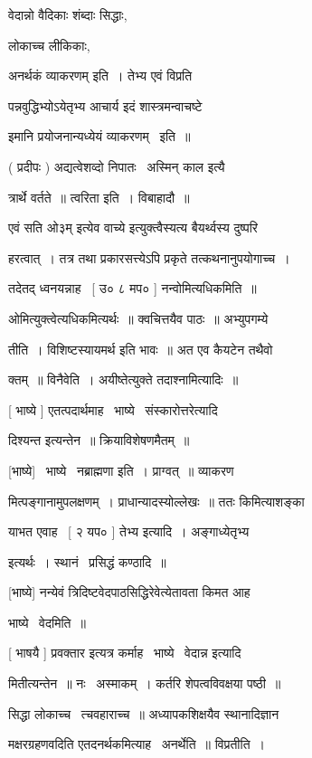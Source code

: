 \documentclass[11pt, openany]{book}
\begin{document}
{\qt वेदान्नो वैदिकाः शंब्दाः सिद्धाः}, 

लोकाच्च लीकिकाः, 

{\qt अनर्थकं व्याकरणम्} इति~। तेभ्य एवं विप्रति \textendash\ 

पन्नवुद्धिभ्योऽयेतृभ्य आचार्य इदं शास्त्रमन्वाचष्टे \textendash\ 

इमानि प्रयोजनान्यध्येयं व्याकरणम् \textendash\ इति~॥ 

( प्रदीपः ) अद्यत्वेशव्दो निपातः \textendash\ अस्मिन् काल इत्यै \textendash\ 

त्रार्थे वर्तते~॥ त्वरिता इति~। विबाहादौ~॥ 

{\qt एवं सति ओ३म्} इत्येव वाच्ये इत्युक्त्वैस्यत्य बैयर्थ्वस्य दुष्परि \textendash\ 

हरत्वात्~। तत्र तथा प्रकारसत्त्येऽपि प्रकृते तत्कथनानुपयोगाच्च~। 

तदेतद् ध्वनयन्नाह \textendash\ [ उ० ८ मप० ] नन्वोमित्यधिकमिति~॥ 

ओमित्युक्त्वेत्यधिकमित्यर्थः~॥ क्वचित्तयैव पाठः~॥ अभ्युपगम्ये \textendash\ 

तीति~। विशिष्टस्यायमर्थ इति भावः~॥ अत एव कैयटेन तथैवो \textendash\ 

क्तम्~॥ विनैवेति~। अयीष्तेत्युक्ते तदाश्नामित्यादिः~॥ 

[ भाष्ये ] एतत्पदार्थमाह \textendash\ भाष्ये \textendash\ संस्कारोत्तरेत्यादि 

दिश्यन्त इत्यन्तेन~॥ क्रियाविशेषणमैतम्~॥ 

[भाष्ये] \textendash\ भाष्ये \textendash\ नब्राह्मणा इति~। प्राग्वत्~॥ व्याकरण \textendash\ 

मित्पङ्गानामुपलक्षणम्~। प्राधान्यादस्योल्लेखः~॥ ततः किमित्याशङ्का \textendash\ 

याभत एवाह \textendash\ [ २ यप० ] तेभ्य इत्यादि~। अङ्गाध्येतृभ्य

इत्यर्थः~। स्थानं \textendash\ प्रसिद्धं कण्ठादि~॥ 

[भाष्ये] नन्येवं त्रिदिष्टवेदपाठसिद्धिरेवेत्येतावता किमत आह \textendash\ 

भाष्ये \textendash\ वेदमिति~॥ 

[ भाषयै ] प्रवक्तार इत्यत्र कर्माह \textendash\ भाष्ये \textendash\ वेदान्न इत्यादि \textendash\ 

मितीत्यन्तेन~॥ नः \textendash\ अस्माकम्~। कर्तरि शेपत्वविवक्षया पष्ठी~॥ 

सिद्धा लोकाच्च \textendash\ त्चवहाराच्च~॥ अध्यापकशिक्षयैव स्थानादिज्ञान \textendash\ 

मक्षरग्रहणवदिति एतदनर्थकमित्याह \textendash\ अनर्थेति~॥ विप्रतीति~। 
\end{document}
